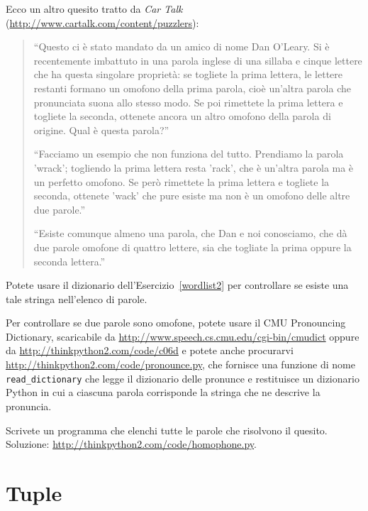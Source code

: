 \documentclass[10pt]{book}
\begin{document}
\vspace{0.2in}
\begin{exercise}

Ecco un altro quesito tratto da {\em Car Talk} (\url{http://www.cartalk.com/content/puzzlers}):

\begin{quote}
``Questo ci è stato mandato da un amico di nome Dan O'Leary. Si è recentemente imbattuto in una parola inglese di una sillaba e cinque lettere che ha questa singolare proprietà: se togliete la prima lettera, le lettere restanti formano un omofono della prima parola, cioè un'altra parola che pronunciata suona allo stesso modo. Se poi rimettete la prima lettera e togliete la seconda, ottenete ancora un altro omofono della parola di origine. Qual è questa parola?''

``Facciamo un esempio che non funziona del tutto. Prendiamo la parola 'wrack'; togliendo la prima lettera resta 'rack', che è un'altra parola ma è un perfetto omofono. Se però rimettete la prima lettera e togliete la seconda, ottenete 'wack' che pure esiste ma non è un omofono delle altre due parole.''

``Esiste comunque almeno una parola, che Dan e noi conosciamo, che dà due parole omofone di quattro lettere, sia che togliate la prima oppure la seconda lettera.''
\end{quote}

Potete usare il dizionario dell'Esercizio~\ref{wordlist2} per controllare se esiste una tale stringa nell'elenco di parole.

Per controllare se due parole sono omofone, potete usare il CMU Pronouncing Dictionary, scaricabile da
\url{http://www.speech.cs.cmu.edu/cgi-bin/cmudict} oppure da
\url{http://thinkpython2.com/code/c06d} e potete anche procurarvi
\url{http://thinkpython2.com/code/pronounce.py}, che fornisce una funzione di nome \verb"read_dictionary" che legge il dizionario delle pronunce e restituisce un dizionario Python in cui a ciascuna parola corrisponde la stringa che ne descrive la pronuncia.

Scrivete un programma che elenchi tutte le parole che risolvono il quesito. Soluzione: \url{http://thinkpython2.com/code/homophone.py}.

\end{exercise}



\chapter{Tuple}
\label{tuplechap}
\end{document}
